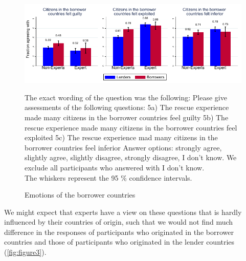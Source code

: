 
\begin{figure}
\begin{center}
    \caption{Emotions of the borrower countries}
    \includegraphics[scale=1.2]{graph5_1.pdf}
    \label{fig:figure3}
    \end{center}
    \tiny 
      \begin{tablenotes} 
      {The exact wording of the question was the following: Please give assessments of the following questions: 5a) The rescue experience made many citizens in the borrower countries feel guilty 
      5b) The rescue experience made many citizens in the borrower countries feel exploited 5c) The rescue experience mad many citizens in the borrower countries feel inferior
      Answer options: strongly agree, slightly agree, slightly disagree, strongly disagree, I don't know. We exclude all participants who answered with I don't know. \\
      The whiskers represent the 95 \% confidence intervals.}
      \end{tablenotes}
\end{figure}

We might expect that experts have a view on these questions that is hardly influenced by their countries of origin, such that we would not find much
difference in the responses of participants who originated in the borrower
countries and those of participants who originated in the lender countries (\autoref{fig:figure3}).


